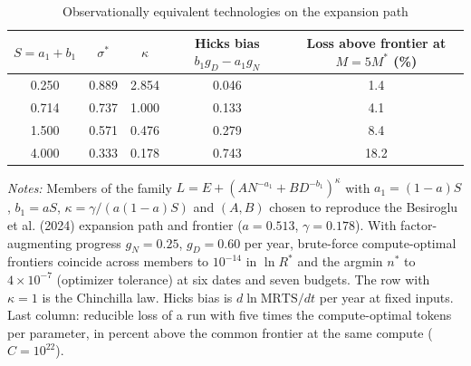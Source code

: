 \begin{table}[htbp]
\centering
\small
\begin{threeparttable}
\caption{Observationally equivalent technologies on the expansion path}
\label{tab:m7_dmr}
\begin{tabular}{@{}ccccc@{}}
\toprule
$S=a_1+b_1$ & $\sigma^*$ & $\kappa$ & Hicks bias $b_1g_D-a_1g_N$ & Loss above frontier at $M=5M^*$ (\%) \\
\midrule
0.250 & 0.889 & 2.854 & 0.046 & 1.4 \\
0.714 & 0.737 & 1.000 & 0.133 & 4.1 \\
1.500 & 0.571 & 0.476 & 0.279 & 8.4 \\
4.000 & 0.333 & 0.178 & 0.743 & 18.2 \\
\bottomrule
\end{tabular}
\begin{tablenotes}\footnotesize
\item \textit{Notes:} Members of the family $L=E+(A N^{-a_1}+B D^{-b_1})^{\kappa}$ with $a_1=(1-a)S$, $b_1=aS$, $\kappa=\gamma/(a(1-a)S)$ and $(A,B)$ chosen to reproduce the Besiroglu et al. (2024) expansion path and frontier ($a=0.513$, $\gamma=0.178$). With factor-augmenting progress $g_N=0.25$, $g_D=0.60$ per year, brute-force compute-optimal frontiers coincide across members to $10^{-14}$ in $\ln R^*$ and the argmin $n^*$ to $4\times10^{-7}$ (optimizer tolerance) at six dates and seven budgets. The row with $\kappa=1$ is the Chinchilla law. Hicks bias is $d\ln\mathrm{MRTS}/dt$ per year at fixed inputs. Last column: reducible loss of a run with five times the compute-optimal tokens per parameter, in percent above the common frontier at the same compute ($C=10^{22}$).
\end{tablenotes}
\end{threeparttable}
\end{table}
